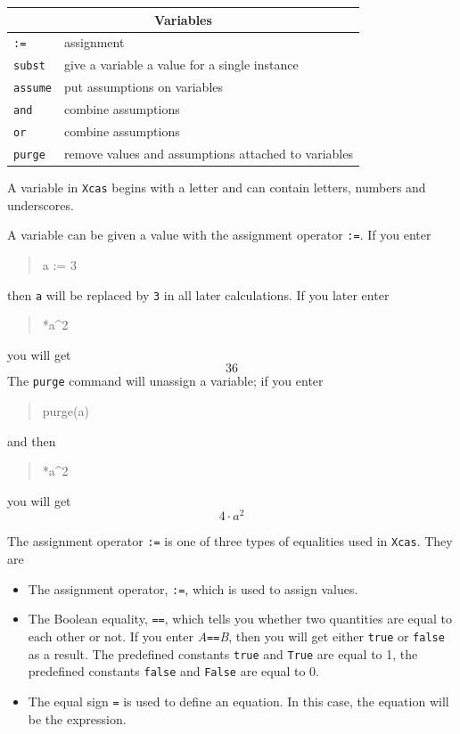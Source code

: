 \documentclass{article}
\newcommand{\xcasin}[1]
{\begin{quote}\ttfamily
#1
\end{quote}}
\newcommand{\xcasout}[1]
{\begin{equation*}
#1
\end{equation*}}
\begin{document}
\begin{center}
\begin{tabular}{|p{}|p{}|}
\hline
\multicolumn{2}{|c|}{\textbf{Variables}}\\
\hline\hline
\texttt{:=}  & assignment \\
\texttt{subst} & give a variable a value for a single instance\\
\texttt{assume}   & put assumptions on variables \\
\texttt{and} & combine assumptions\\
\texttt{or} & combine assumptions\\
\texttt{purge}   & remove values and assumptions attached to variables \\
\hline
\end{tabular}
\end{center}

A variable in \texttt{Xcas} begins with a letter and can contain
letters, numbers and underscores.  

A variable can be given a value with the assignment operator \texttt{:=}.
If you enter
\xcasin{a := 3}
then \texttt{a} will be replaced by \texttt{3} in all later
calculations.  If you later enter
\xcasin{4*a\^{}2}
you will get
\xcasout{36}
The \texttt{purge} command will unassign a variable; if you enter
\xcasin{purge(a)}
and then
\xcasin{4*a\^{}2}
you will get
\xcasout{4\cdot a^2}

The assignment operator \texttt{:=} is one of three types of
equalities used in \texttt{Xcas}.  They are
\begin{itemize}
  \item
  The assignment operator, \texttt{:=}, 
  which is used to assign values.
  \item
  The Boolean equality, \texttt{==}, 
  which tells you whether two
  quantities are equal to each other or not.  If you enter
  \textit{A}\texttt{==}\textit{B}, then you will get either
  \texttt{true} or \texttt{false} as a result.  The predefined
  constants \texttt{true} and \texttt{True} are equal to 1, the
  predefined constants \texttt{false} and \texttt{False} are equal to 0.
  \item
  The equal sign \texttt{=} is used to define an 
  equation.  In this case, the equation will be the expression.
\end{itemize}
\end{document}
